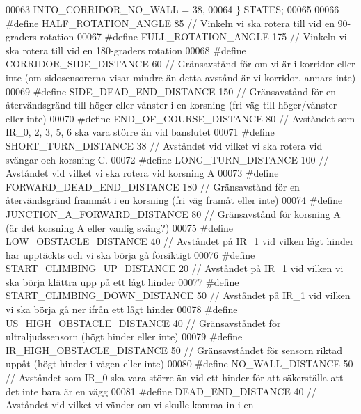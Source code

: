 \begin{DoxyCode}
00063     INTO\_CORRIDOR\_NO\_WALL = 38,
00064 \} STATES;
00065 
00066 \textcolor{preprocessor}{#define HALF\_ROTATION\_ANGLE 85          // Vinkeln vi ska rotera till vid en 90-graders rotation}
00067 \textcolor{preprocessor}{#define FULL\_ROTATION\_ANGLE 175         // Vinkeln vi ska rotera till vid en 180-graders rotation}
00068 \textcolor{preprocessor}{#define CORRIDOR\_SIDE\_DISTANCE 60       // Gränsavstånd för om vi är i korridor eller inte (om
       sidosensorerna visar mindre än detta avstånd är vi korridor, annars inte)}
00069 \textcolor{preprocessor}{#define SIDE\_DEAD\_END\_DISTANCE 150      // Gränsavstånd för en återvändsgränd till höger eller vänster i en
       korsning (fri väg till höger/vänster eller inte)}
00070 \textcolor{preprocessor}{#define END\_OF\_COURSE\_DISTANCE 80       // Avståndet som IR\_0, 2, 3, 5, 6 ska vara större än vid banslutet}
00071 \textcolor{preprocessor}{#define SHORT\_TURN\_DISTANCE 38          // Avståndet vid vilket vi ska rotera vid svängar och korsning C.}
00072 \textcolor{preprocessor}{#define LONG\_TURN\_DISTANCE 100          // Avståndet vid vilket vi ska rotera vid korsning A}
00073 \textcolor{preprocessor}{#define FORWARD\_DEAD\_END\_DISTANCE 180       // Gränsavstånd för en återvändsgränd frammåt i en korsning
       (fri väg framåt eller inte)}
00074 \textcolor{preprocessor}{#define JUNCTION\_A\_FORWARD\_DISTANCE 80      // Gränsavstånd för korsning A (är det korsning A eller vanlig
       sväng?)}
00075 \textcolor{preprocessor}{#define LOW\_OBSTACLE\_DISTANCE 40        // Avståndet på IR\_1 vid vilken lågt hinder har upptäckts och vi
       ska börja gå försiktigt}
00076 \textcolor{preprocessor}{#define START\_CLIMBING\_UP\_DISTANCE 20       // Avståndet på IR\_1 vid vilken vi ska börja klättra upp på ett
       lågt hinder}
00077 \textcolor{preprocessor}{#define START\_CLIMBING\_DOWN\_DISTANCE 50     // Avståndet på IR\_1 vid vilken vi ska börja gå ner ifrån ett
       lågt hinder}
00078 \textcolor{preprocessor}{#define US\_HIGH\_OBSTACLE\_DISTANCE 40        // Gränsavståndet för ultraljudssensorn (högt hinder eller
       inte)}
00079 \textcolor{preprocessor}{#define IR\_HIGH\_OBSTACLE\_DISTANCE 50        // Gränsavståndet för sensorn riktad uppåt (högt hinder i vägen
       eller inte) }
00080 \textcolor{preprocessor}{#define NO\_WALL\_DISTANCE 50         // Avståndet som IR\_0 ska vara större än vid ett hinder för att
       säkerställa att det inte bara är en vägg}
00081 \textcolor{preprocessor}{#define DEAD\_END\_DISTANCE 40            // Avståndet vid vilket vi vänder om vi skulle komma in i en
}
\end{DoxyCode}

